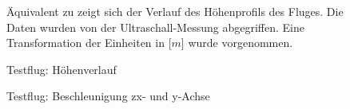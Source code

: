 \begin{figure}[ht!]
\vspace{0.25cm}
\begin{center}
\caption{Testflug: Höhenverlauf}
\label{fig:FlightHeight}
\end{center}

\vspace{0.25cm}
Äquivalent zu  zeigt sich der Verlauf des Höhenprofils des Fluges. Die Daten wurden von der Ultraschall-Messung abgegriffen. Eine Transformation der Einheiten in [$m$] wurde vorgenommen.
\end{figure}


\begin{figure}[ht!]
\vspace{0.25cm}
\begin{center}
\caption{Testflug: Beschleunigung zx- und y-Achse}
\label{fig:Flightaxay}
\end{center}

\vspace{0.25cm}

\end{figure}



